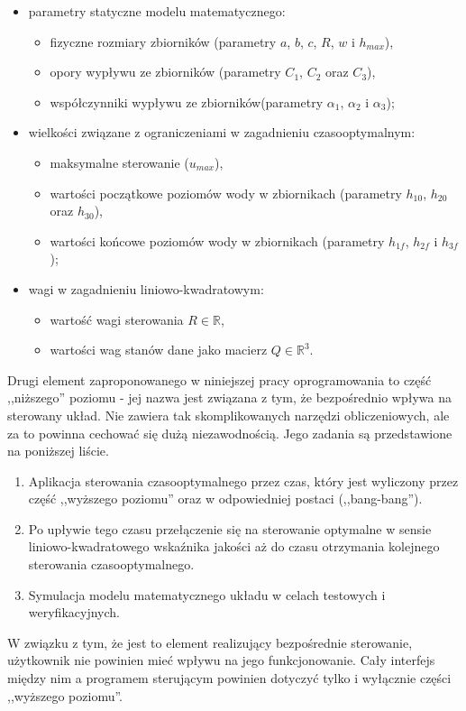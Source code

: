 \begin{itemize}
    \item parametry statyczne modelu matematycznego:
    \begin{itemize}
        \item fizyczne rozmiary zbiorników (parametry $a$, $b$, $c$, $R$, $w$ i $h_{max}$),
        \item opory wypływu ze zbiorników (parametry $C_{1}$, $C_{2}$ oraz $C_{3}$),
        \item współczynniki wypływu ze zbiorników(parametry $\alpha_{1}$, $\alpha_{2}$ i $\alpha_{3}$);
    \end{itemize}
    \item wielkości związane z ograniczeniami w zagadnieniu czasooptymalnym:
    \begin{itemize}
        \item maksymalne sterowanie ($u_{max}$),
        \item wartości początkowe poziomów wody w zbiornikach (parametry $h_{10}$, $h_{20}$ oraz $h_{30}$),
        \item wartości końcowe poziomów wody w zbiornikach (parametry $h_{1f}$, $h_{2f}$ i $h_{3f}$);
    \end{itemize}
    \item wagi w zagadnieniu liniowo-kwadratowym:
    \begin{itemize}
        \item wartość wagi sterowania $R \in \mathbb{R}$,
        \item wartości wag stanów dane jako macierz $Q \in \mathbb{R}^{3}$.
    \end{itemize}
\end{itemize}

Drugi element zaproponowanego w niniejszej pracy oprogramowania to część ,,niższego'' poziomu - jej nazwa jest związana z tym, że bezpośrednio wpływa na sterowany układ. Nie zawiera tak skomplikowanych narzędzi obliczeniowych, ale za to powinna cechować się dużą niezawodnością. Jego zadania są przedstawione na poniższej liście.

\begin{enumerate}
    \item Aplikacja sterowania czasooptymalnego przez czas, który jest wyliczony przez część ,,wyższego poziomu'' oraz w odpowiedniej postaci (,,bang-bang'').
    \item Po upływie tego czasu przełączenie się na sterowanie optymalne w sensie liniowo-kwadratowego wskaźnika jakości aż do czasu otrzymania kolejnego sterowania czasooptymalnego.
    \item Symulacja modelu matematycznego układu w celach testowych i weryfikacyjnych.
\end{enumerate}

W związku z tym, że jest to element realizujący bezpośrednie sterowanie, użytkownik nie powinien mieć wpływu na jego funkcjonowanie. Cały interfejs między nim a programem sterującym powinien dotyczyć tylko i wyłącznie części ,,wyższego poziomu''.
